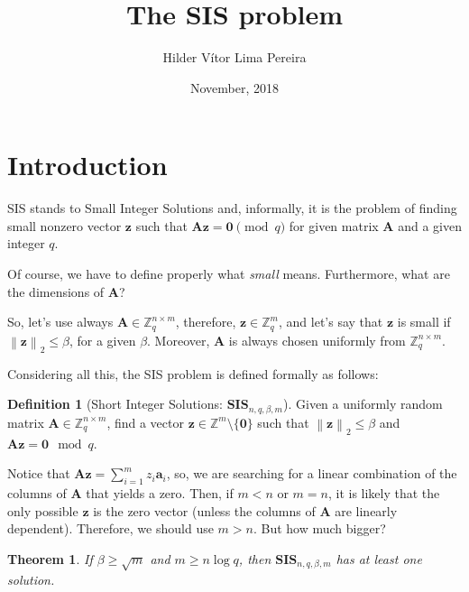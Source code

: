 \documentclass[a4paper,11pt]{article}
\title{The SIS problem}
\author{Hilder Vítor Lima Pereira}
\date{November, 2018}
\let\vec\mathbf %
\newcommand\Zqm{{\mathbb Z}_q^m}
\newcommand\Zm{{\mathbb Z}^m}
\newcommand\Zqnm{{\mathbb Z}_q^{n\times m}}
\newcommand\A{{\mathbf A}}
\newcommand\SIS{\textbf{SIS}_{n, q, \beta, m}}
\newcommand{\norm}[1]{\left\lVert #1 \right\rVert_2}
\newtheorem{theorem}{Theorem}[section]
\theoremstyle{definition}
\newtheorem{definition}{Definition}[section]
\theoremstyle{remark}
\begin{document}
\maketitle


\section{Introduction}

SIS stands to Small Integer Solutions and, informally, it is the problem of
finding small nonzero vector $\vec{z}$ such that $\vec{ A z} = \vec{0} \pmod q$
for given matrix $\A$ and a given integer $q$.

Of course, we have to define properly what \emph{small} means. Furthermore,
what are the dimensions of $\A$?

So, let's use always $\A \in \Zqnm$, therefore, $\vec z \in \Zqm$, and let's
say that $\vec z$ is small if $\norm{\vec z} \le \beta$, for a given $\beta$.
Moreover, $\A$ is always chosen uniformly from $\Zqnm$.

Considering all this, the SIS problem is defined formally as follows:

\begin{definition}[Short Integer Solutions: $\SIS$] Given a uniformly random
matrix $\A \in \Zqnm$, find a vector $\vec z \in \Zm \setminus \{\vec 0\} $
such that
$\norm{\vec z} \le \beta$ and $\A \vec z = \vec 0 \mod q$.
\end{definition}

Notice that $\A \vec z = \sum_{i=1}^{m} z_i \vec{a}_i$, so, we are searching
for a linear combination of the columns of $\A$ that yields a zero. Then, if
$m<n$ or $m=n$, it is likely that the only possible $\vec z$ is the zero vector
(unless the columns of $\A$ are linearly dependent). Therefore, we should use
$m > n$. But how much bigger?

\begin{theorem}
If $\beta\ge \sqrt{m}$ and $m \ge n\log q$, then $\SIS$ has at least one 
solution.
\end{theorem}
\end{document}
